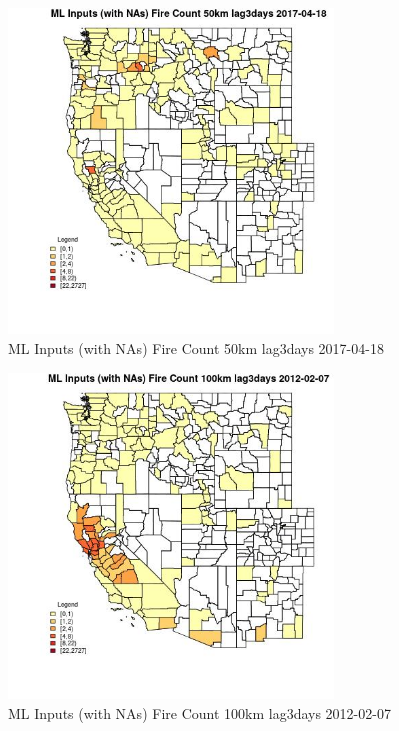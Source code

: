 \begin{figure} 
\centering  
\includegraphics[width=0.77\textwidth]{Code_Outputs/Report_ML_input_PM25_Step4_part_f_de_duplicated_aveswNAs_CountyFire_Count_50km_lag3daysMean2017-04-18.jpg} 
\caption{\label{fig:Report_ML_input_PM25_Step4_part_f_de_duplicated_aveswNAsCountyFire_Count_50km_lag3daysMean2017-04-18}ML Inputs (with NAs) Fire Count 50km lag3days 2017-04-18} 
\end{figure} 
 

\begin{figure} 
\centering  
\includegraphics[width=0.77\textwidth]{Code_Outputs/Report_ML_input_PM25_Step4_part_f_de_duplicated_aveswNAs_CountyFire_Count_100km_lag3daysMean2012-02-07.jpg} 
\caption{\label{fig:Report_ML_input_PM25_Step4_part_f_de_duplicated_aveswNAsCountyFire_Count_100km_lag3daysMean2012-02-07}ML Inputs (with NAs) Fire Count 100km lag3days 2012-02-07} 
\end{figure} 
 

